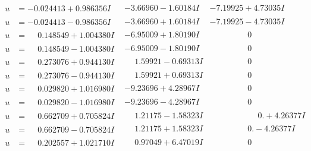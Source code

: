 \documentclass[1p]{elsarticle_modified}
\theoremstyle{definition}
\begin{document}
$$\begin{array}{c|c|c}
\begin{aligned}
u &= -0.024413 + 0.986356 I\end{aligned}
 & -3.66960 - 1.60184 I & -7.19925 + 4.73035 I \\ \hline\begin{aligned}
u &= -0.024413 - 0.986356 I\end{aligned}
 & -3.66960 + 1.60184 I & -7.19925 - 4.73035 I \\ \hline\begin{aligned}
u &= \phantom{-}0.148549 + 1.004380 I\end{aligned}
 & -6.95009 + 1.80190 I & \phantom{-0.000000 } 0 \\ \hline\begin{aligned}
u &= \phantom{-}0.148549 - 1.004380 I\end{aligned}
 & -6.95009 - 1.80190 I & \phantom{-0.000000 } 0 \\ \hline\begin{aligned}
u &= \phantom{-}0.273076 + 0.944130 I\end{aligned}
 & \phantom{-}1.59921 - 0.69313 I & \phantom{-0.000000 } 0 \\ \hline\begin{aligned}
u &= \phantom{-}0.273076 - 0.944130 I\end{aligned}
 & \phantom{-}1.59921 + 0.69313 I & \phantom{-0.000000 } 0 \\ \hline\begin{aligned}
u &= \phantom{-}0.029820 + 1.016980 I\end{aligned}
 & -9.23696 + 4.28967 I & \phantom{-0.000000 } 0 \\ \hline\begin{aligned}
u &= \phantom{-}0.029820 - 1.016980 I\end{aligned}
 & -9.23696 - 4.28967 I & \phantom{-0.000000 } 0 \\ \hline\begin{aligned}
u &= \phantom{-}0.662709 + 0.705824 I\end{aligned}
 & \phantom{-}1.21175 - 1.58323 I & \phantom{-0.000000 -}0. + 4.26377 I \\ \hline\begin{aligned}
u &= \phantom{-}0.662709 - 0.705824 I\end{aligned}
 & \phantom{-}1.21175 + 1.58323 I & \phantom{-0.000000 } 0. - 4.26377 I \\ \hline\begin{aligned}
u &= \phantom{-}0.202557 + 1.021710 I\end{aligned}
 & \phantom{-}0.97049 + 6.47019 I & \phantom{-0.000000 } 0 \\ \hline\begin{aligned}

\end{aligned}
\end{array}$$
\end{document}
